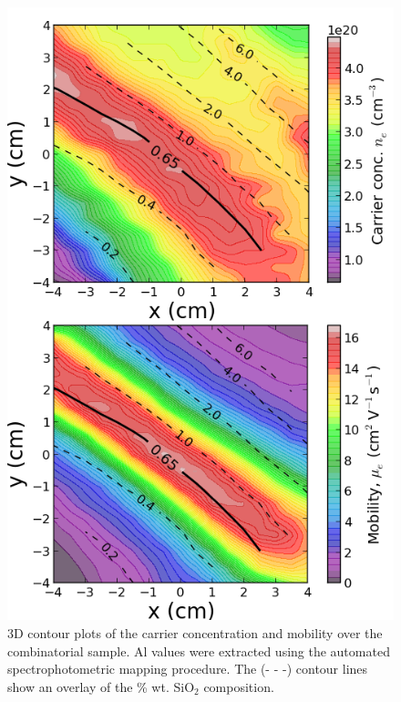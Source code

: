 \documentclass[preprint]{elsarticle}
\begin{document}
\begin{figure}[p]
\centering
\includegraphics[scale=0.5]{figure2.png}
\caption{\label{fig:5} 3D contour plots of the carrier concentration and mobility over the combinatorial sample. Al values were extracted using the automated spectrophotometric mapping procedure. The (- - -) contour lines show an overlay of the \% wt. SiO$_{2}$ composition.}
\end{figure}
\end{document}

